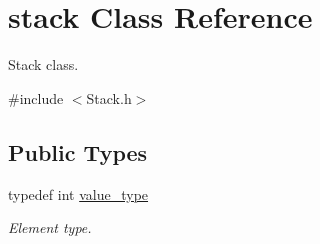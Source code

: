 \hypertarget{classstack}{}\section{stack Class Reference}
\label{classstack}


Stack class.  




{\ttfamily \#include $<$Stack.\+h$>$}

\subsection*{Public Types}
\begin{DoxyCompactItemize}
\item 
\mbox{\label{classstack_acb2e70c8f4214e9446e9f69f69da8b94}} 
typedef int \hyperlink{classstack_acb2e70c8f4214e9446e9f69f69da8b94}{value\+\_\+type}
\begin{DoxyCompactList}\small\item\em Element type. \end{DoxyCompactList}\end{DoxyCompactItemize}
